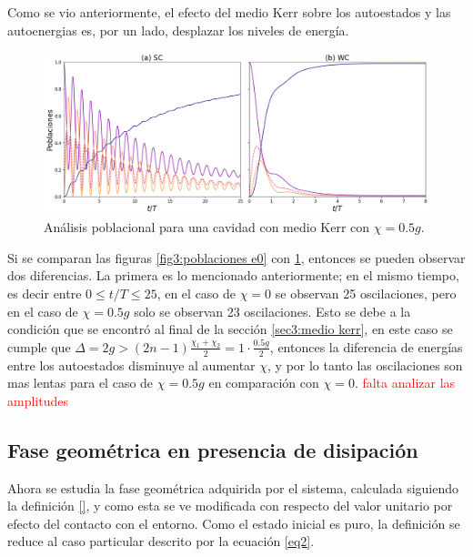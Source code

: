Como se vio anteriormente, el efecto del medio Kerr sobre los autoestados y las autoenergias es, por un lado, desplazar los niveles de energía.
\begin{figure}
    \centering
    \includegraphics[width=\textwidth]{figuras/ch3/poblaciones kerr.png}
    \caption{Análisis poblacional para una cavidad con medio Kerr con $\chi=0.5g$.}
    \label{fig3:poblaciones kerr}
\end{figure}
Si se comparan las figuras \ref{fig3:poblaciones e0} con \ref{fig3:poblaciones kerr}, entonces se pueden observar dos diferencias. La primera es lo mencionado anteriormente; en el mismo tiempo, es decir entre $0\leq t/T \leq 25$, en el caso de $\chi=0$ se observan 25 oscilaciones, pero en el caso de $\chi=0.5g$ solo se observan 23 oscilaciones. Esto se debe a la condición que se encontró al final de la sección \ref{sec3:medio kerr}, en este caso se cumple que $\Delta=2g>(2n-1)\frac{\chi_1+\chi_2}{2}=1\cdot\frac{0.5g}{2}$, entonces la diferencia de energías entre los autoestados disminuye al aumentar $\chi$, y por lo tanto las oscilaciones son mas lentas para el caso de $\chi=0.5g$ en comparación con $\chi=0$.
\textcolor{red}{falta analizar las amplitudes}
\subsection{Fase geométrica en presencia de disipación}
\label{sec3:fg disipacion}
Ahora se estudia la fase geométrica adquirida por el sistema, calculada siguiendo la definición \ref{}, y como esta se ve modificada con respecto del valor unitario por efecto del contacto con el entorno. Como el estado inicial es puro, la definición se reduce al caso particular descrito por la ecuación \ref{eq2}.

